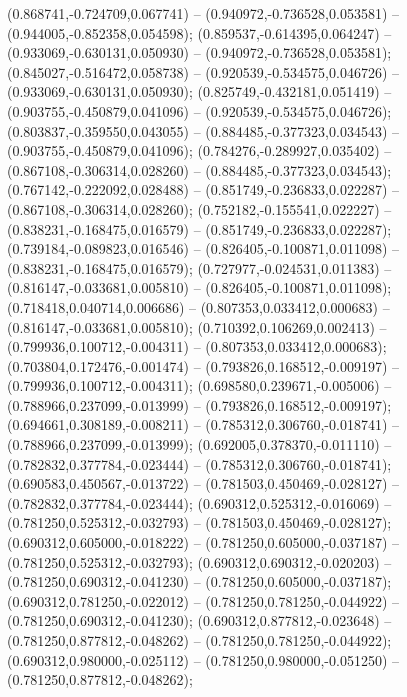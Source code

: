  (0.868741,-0.724709,0.067741) -- (0.940972,-0.736528,0.053581) -- (0.944005,-0.852358,0.054598);
 (0.859537,-0.614395,0.064247) -- (0.933069,-0.630131,0.050930) -- (0.940972,-0.736528,0.053581);
 (0.845027,-0.516472,0.058738) -- (0.920539,-0.534575,0.046726) -- (0.933069,-0.630131,0.050930);
 (0.825749,-0.432181,0.051419) -- (0.903755,-0.450879,0.041096) -- (0.920539,-0.534575,0.046726);
 (0.803837,-0.359550,0.043055) -- (0.884485,-0.377323,0.034543) -- (0.903755,-0.450879,0.041096);
 (0.784276,-0.289927,0.035402) -- (0.867108,-0.306314,0.028260) -- (0.884485,-0.377323,0.034543);
 (0.767142,-0.222092,0.028488) -- (0.851749,-0.236833,0.022287) -- (0.867108,-0.306314,0.028260);
 (0.752182,-0.155541,0.022227) -- (0.838231,-0.168475,0.016579) -- (0.851749,-0.236833,0.022287);
 (0.739184,-0.089823,0.016546) -- (0.826405,-0.100871,0.011098) -- (0.838231,-0.168475,0.016579);
 (0.727977,-0.024531,0.011383) -- (0.816147,-0.033681,0.005810) -- (0.826405,-0.100871,0.011098);
 (0.718418,0.040714,0.006686) -- (0.807353,0.033412,0.000683) -- (0.816147,-0.033681,0.005810);
 (0.710392,0.106269,0.002413) -- (0.799936,0.100712,-0.004311) -- (0.807353,0.033412,0.000683);
 (0.703804,0.172476,-0.001474) -- (0.793826,0.168512,-0.009197) -- (0.799936,0.100712,-0.004311);
 (0.698580,0.239671,-0.005006) -- (0.788966,0.237099,-0.013999) -- (0.793826,0.168512,-0.009197);
 (0.694661,0.308189,-0.008211) -- (0.785312,0.306760,-0.018741) -- (0.788966,0.237099,-0.013999);
 (0.692005,0.378370,-0.011110) -- (0.782832,0.377784,-0.023444) -- (0.785312,0.306760,-0.018741);
 (0.690583,0.450567,-0.013722) -- (0.781503,0.450469,-0.028127) -- (0.782832,0.377784,-0.023444);
 (0.690312,0.525312,-0.016069) -- (0.781250,0.525312,-0.032793) -- (0.781503,0.450469,-0.028127);
 (0.690312,0.605000,-0.018222) -- (0.781250,0.605000,-0.037187) -- (0.781250,0.525312,-0.032793);
 (0.690312,0.690312,-0.020203) -- (0.781250,0.690312,-0.041230) -- (0.781250,0.605000,-0.037187);
 (0.690312,0.781250,-0.022012) -- (0.781250,0.781250,-0.044922) -- (0.781250,0.690312,-0.041230);
 (0.690312,0.877812,-0.023648) -- (0.781250,0.877812,-0.048262) -- (0.781250,0.781250,-0.044922);
 (0.690312,0.980000,-0.025112) -- (0.781250,0.980000,-0.051250) -- (0.781250,0.877812,-0.048262);
